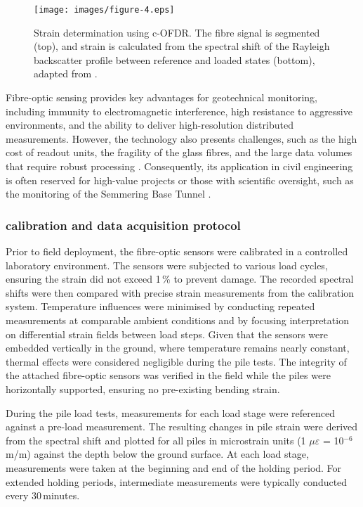 {{{\begin{figure}[!htb]
	\centering
	\texttt{[image: images/figure-4.eps]}
	\caption{Strain determination using c-OFDR. The fibre signal is segmented (top), and strain is calculated from the spectral shift of the Rayleigh backscatter profile between reference and loaded states (bottom), adapted from \textcite{Kunzel.2016}.}
	\label{fig:Faseroptik_Dehnung}
\end{figure}

Fibre-optic sensing provides key advantages for geotechnical monitoring, including immunity to electromagnetic interference, high resistance to aggressive environments, and the ability to deliver high-resolution distributed measurements. However, the technology also presents challenges, such as the high cost of readout units, the fragility of the glass fibres, and the large data volumes that require robust processing \parencite{Weisbrich.2021}. Consequently, its application in civil engineering is often reserved for high-value projects or those with scientific oversight, such as the monitoring of the Semmering Base Tunnel \parencite{Schuller.2014}.

\subsubsection{calibration and data acquisition protocol}

Prior to field deployment, the fibre-optic sensors were calibrated in a controlled laboratory environment. The sensors were subjected to various load cycles, ensuring the strain did not exceed 1\,\% to prevent damage. The recorded spectral shifts were then compared with precise strain measurements from the calibration system. Temperature influences were minimised by conducting repeated measurements at comparable ambient conditions and by focusing interpretation on differential strain fields between load steps. Given that the sensors were embedded vertically in the ground, where temperature remains nearly constant, thermal effects were considered negligible during the pile tests. The integrity of the attached fibre-optic sensors was verified in the field while the piles were horizontally supported, ensuring no pre-existing bending strain. 

During the pile load tests, measurements for each load stage were referenced against a pre-load measurement. The resulting changes in pile strain were derived from the spectral shift and plotted for all piles in microstrain units (1 $\mu \varepsilon$ = 10$^{-6}$ m/m) against the depth below the ground surface. At each load stage, measurements were taken at the beginning and end of the holding period. For extended holding periods, intermediate measurements were typically conducted every 30\,minutes.

}}}
